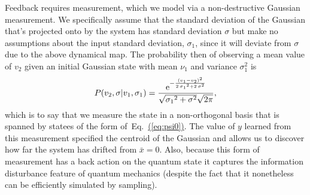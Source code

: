 \documentclass[superscriptaddress,aps,pra,nofootinbib,onecolumn,notitlepage,10pt]{revtex4-1}
\newcommand{\eq}[1]{Eq.~\hyperref[eq:#1]{(\ref*{eq:#1})}}
\begin{document}
Feedback requires measurement, which we model via a non-destructive Gaussian measurement.  We specifically assume that the standard deviation of the Gaussian that's projected onto by the system has standard deviation $\sigma$ but make no assumptions about the input standard deviation, $\sigma_1$, since it will deviate from $\sigma$ due to the above dynamical map.
The probability then of observing a mean value of $v_2$ given an initial Gaussian state with mean $\nu_1$ and variance $\sigma_1^2$ is
\begin{equation}
P(v_2,\sigma|v_1,\sigma_1) = \frac {{\rm e}^{-{\frac { \left( v_1-v_2 \right) ^{2}}{2\,{{
\sigma_1}}^{2}+2\,{{\sigma}}^{2}}}}}{\sqrt {{{\sigma_1}}^{2}+{{\sigma}}^{2}}
\sqrt {2\pi}}
,
\end{equation}
which is to say that we measure the state in a non-orthogonal basis that is spanned by statees of the form of~\eq{psi0}.  The value of $y$ learned from this measurement specified
the centroid of the Gaussian and allows us to discover how far the system has drifted from $\bar{x}=0$.  Also, because this form of measurement has a back action on the quantum state it captures the information disturbance feature of quantum mechanics (despite the fact that it nonetheless can be efficiently simulated by sampling).
\end{document}
